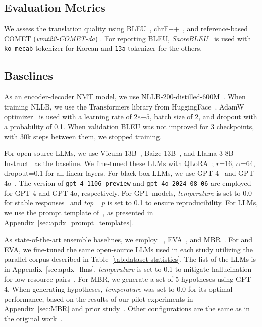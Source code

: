 \subsection{Evaluation Metrics}
We assess the translation quality using BLEU~\cite{papineni-etal-2002-bleu}, chrF++~\cite{popovic-2017-chrf}, and reference-based COMET (\textit{wmt22-COMET-da}) \cite{comet22}.
For reporting BLEU, \textit{SacreBLEU}~\cite{post-2018-call} is used with \texttt{ko-mecab} tokenizer for Korean and \texttt{13a} tokenizer for the others.


\subsection{Baselines}
\label{sec:baselines}

As an encoder-decoder NMT model, we use NLLB-200-distilled-600M~\cite{nllb}.
When training NLLB, we use the Transformers library from HuggingFace~\cite{wolf2020huggingfaces}.
AdamW optimizer~\cite{adamw} is used with a learning rate of $2e$$-$$5$, batch size of 2, and dropout with a probability of 0.1.
When validation BLEU was not improved for 3 checkpoints, with 30k steps between them, we stopped training.


For open-source LLMs, we use Vicuna 13B~\cite{Vicuna}, Baize 13B~\cite{baize}, and Llama-3-8B-Instruct~\cite{llama3modelcard} as the baseline. 
We fine-tuned these LLMs with QLoRA~\cite{dettmers2024qlora}; $r$=16, $\alpha$=64, dropout=0.1 for all linear layers.
For black-box LLMs, we use GPT-4~\cite{gpt4} and GPT-4o~\cite{gpt4o}.
The version of \texttt{gpt-4-1106-preview} and \texttt{gpt-4o-2024-08-06} are employed for GPT-4 and GPT-4o, respectively.
For GPT models, \textit{temperature} is set to 0.0 for stable responses~\cite{peng2023making} and \textit{top\_ p} is set to 0.1 to ensure reproducibility. 
For LLMs, we use the prompt template of~\citet{howgood}, as presented in Appendix~\ref{sec:apdx_prompt_templates}.


As state-of-the-art ensemble baselines, we employ \blender~\cite{llm-blender}, EVA~\cite{eva}, and MBR~\cite{mbr}.
For \blender and EVA, we fine-tuned the same open-source LLMs used in each study utilizing the parallel corpus described in Table~\ref{tab:dataset statistics}.
The list of the LLMs is in Appendix~\ref{sec:apdx_llms}.
\textit{temperature} is set to 0.1 to mitigate hallucination for low-resource pairs~\cite{guerreiro2023hallucinations}.
For MBR, we generate a set of 5 hypotheses using GPT-4.
When generating hypotheses, \textit{temperature} was set to 0.0 for its optimal performance, based on the results of our pilot experiments in Appendix~\ref{sec:MBR} and prior study~\cite{peng2023making}.
Other configurations are the same as in the original work~\cite{mbr}.

